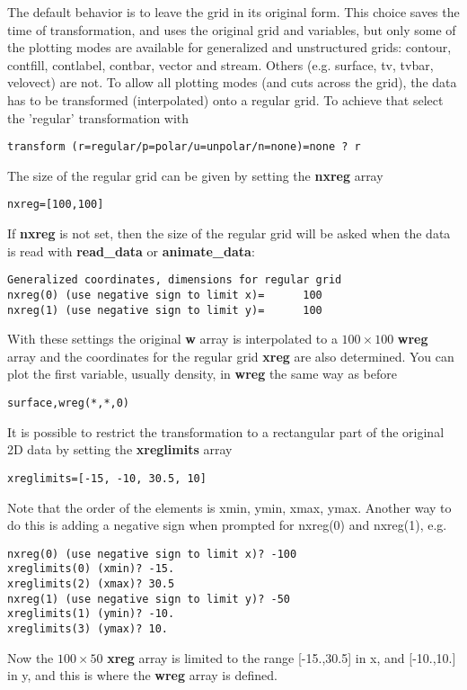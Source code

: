 \documentclass{article}
\begin{document}
The default behavior is to leave the grid in its original form.
This choice saves the time of transformation, and uses the original grid 
and variables, but only some of the plotting modes are available for 
generalized and unstructured grids: contour, contfill, contlabel, contbar,
vector and stream. Others (e.g. surface, tv, tvbar, velovect) are not.
To allow all plotting modes (and cuts across the grid), the data
has to be transformed (interpolated) onto a regular grid.
To achieve that select the 'regular' transformation with
\begin{verbatim}
transform (r=regular/p=polar/u=unpolar/n=none)=none ? r
\end{verbatim}
   The size of the regular grid can be given by setting the {\bf nxreg} array
\begin{verbatim}
nxreg=[100,100]
\end{verbatim}
If {\bf nxreg} is not set, then  the size of the regular grid will be asked
when the data is read with {\bf read\_data} or {\bf animate\_data}:
\begin{verbatim}
Generalized coordinates, dimensions for regular grid
nxreg(0) (use negative sign to limit x)=      100
nxreg(1) (use negative sign to limit y)=      100
\end{verbatim}
With these settings the original {\bf w} array is interpolated to 
a $100\times100$ {\bf wreg} array and the
coordinates for the regular grid {\bf xreg} are also determined. 
You can plot the first variable, usually density, in {\bf wreg} the 
same way as before
\begin{verbatim}
surface,wreg(*,*,0)
\end{verbatim}
It is possible to restrict the transformation to a rectangular
part of the original 2D data by setting the {\bf xreglimits} array
\begin{verbatim}
xreglimits=[-15, -10, 30.5, 10]
\end{verbatim}
Note that the order of the elements is xmin, ymin, xmax, ymax.
Another way to do this is adding a negative sign when prompted for 
nxreg(0) and nxreg(1), e.g.
\begin{verbatim}
nxreg(0) (use negative sign to limit x)? -100
xreglimits(0) (xmin)? -15.
xreglimits(2) (xmax)? 30.5
nxreg(1) (use negative sign to limit y)? -50
xreglimits(1) (ymin)? -10.
xreglimits(3) (ymax)? 10.
\end{verbatim}
Now the $100\times 50$ {\bf xreg} array is limited to the range 
[-15.,30.5] in x, and [-10.,10.] in y, and this is where the {\bf wreg} 
array is defined. 
\end{document}
